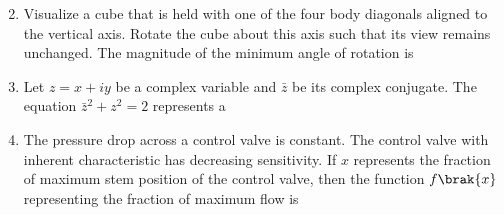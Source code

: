 \documentclass[journal,12pt,onecolumn]{IEEEtran}
\theoremstyle{remark}
\begin{document}
\begin{enumerate}
\begin{enumerate}
\begin{multicols}{2}
    
    \end{multicols}
    \end{enumerate}

\item Visualize a cube that is held with one of the four body diagonals aligned to the vertical axis. Rotate the cube about this axis such that its view remains unchanged. The magnitude of the minimum angle of rotation is
\par\hfill{}
    \begin{enumerate}
    \end{enumerate}

\item Let $z = x + i y$ be a complex variable and $\bar{z}$ be its complex conjugate. The equation $\bar{z}^2 + z^2 = 2$ represents a
\par\hfill{}
    \begin{enumerate}
    \end{enumerate}

\item The pressure drop across a control valve is constant. The control valve with inherent characteristic has decreasing sensitivity. If $x$ represents the fraction of maximum stem position of the control valve, then the function $f\brak{x}$ representing the fraction of maximum flow is
\par\hfill{}
    \begin{enumerate}
    \end{enumerate}


\end{enumerate}
\end{document}
